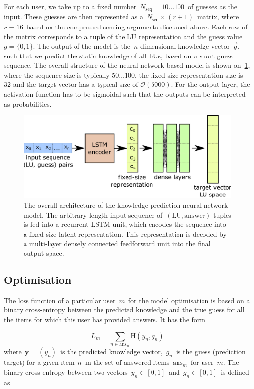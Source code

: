 For each user, we take up to a fixed number~$N_{\mathrm{seq}} = 10\dots100$~of guesses as the input. These guesses are then represented as a~$N_{\mathrm{seq}} \times (r + 1)$~matrix, where~$r=16$~based on the compressed sensing arguments discussed above. Each row of the matrix corresponds to a tuple of the LU representation and the guess value~$g=\{0,1\}$. The output of the model is the~$n$-dimensional knowledge vector~$\vec{g}$, such that we predict the static knowledge of all LUs, based on a short guess sequence. The overall structure of the neural network based model is shown on~\cref{fig:network}, where the sequence size is typically $50\dots 100$, the fixed-size representation size is $32$ and the target vector has a typical size of $\mathcal{O}(5000)$. For the output layer, the activation function has to be sigmoidal such that the outputs can be interpreted as probabilities.

\begin{figure}[ht]
\centering
\includegraphics[width=0.7\linewidth]{figures/lingvist/network.pdf}
\caption[Overall network architecture]{The overall architecture of the knowledge prediction neural network model. The arbitrary-length input sequence of~$(\mathrm{LU}, \mathrm{answer})$ tuples is fed into a recurrent LSTM unit, which encodes the sequence into a fixed-size latent representation. This representation is decoded by a multi-layer densely connected feedforward unit into the final output space.} 
\label{fig:network} 
\end{figure} 

\subsection{Optimisation}
The loss function of a particular user~$m$~for the model optimisation is based on a binary cross-entropy between the predicted knowledge and the true guess for all the items for which this user has provided answers. It has the form

\begin{equation}
L_m = \sum_{n \in \mathrm{ans}_m} \mathrm{H}(y_n, g_n)
\end{equation}
where~$\mathbf{y} = (y_n)$~is the predicted knowledge vector,~$g_n$~is the guess (prediction target) for a given item~$n$~in the set of answered items~$\mathrm{ans}_m$~for user~$m$. The binary cross-entropy between two vectors~$y_n\in[0,1]$~and~$g_n\in [0,1]$~is defined as

